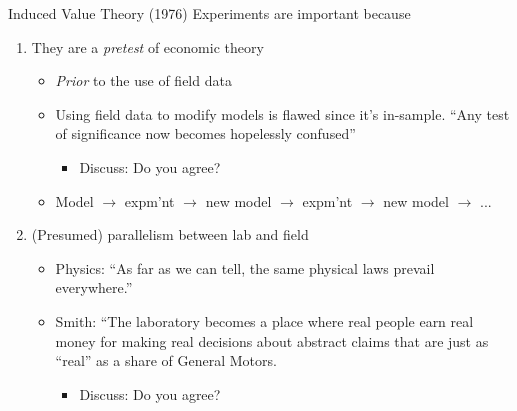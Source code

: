 \begin{frame}{Induced Value Theory (1976)}
    Experiments are important because
    \begin{enumerate}
        \item They are a \textit{pretest} of economic theory
        \begin{itemize}
            \item \emph{Prior} to the use of field data
            \item Using field data to modify models is flawed since it's in-sample. ``Any test of significance now becomes hopelessly confused''
            \begin{itemize}
                \item Discuss: Do you agree?
            \end{itemize}
            \item Model $\rightarrow$ expm'nt $\rightarrow$ new model $\rightarrow$ expm'nt $\rightarrow$ new model $\rightarrow$ ...
        \end{itemize}
        \item (Presumed) parallelism between lab and field
        \begin{itemize}
            \item Physics: ``As far as we can tell, the same physical laws prevail everywhere.''
            \item Smith: ``The laboratory becomes a place where real people earn real money for making real decisions about abstract claims that are just as ``real'' as a share of General Motors.
            \begin{itemize}
                \item Discuss: Do you agree?
            \end{itemize}
        \end{itemize}
    \end{enumerate}
\end{frame}

